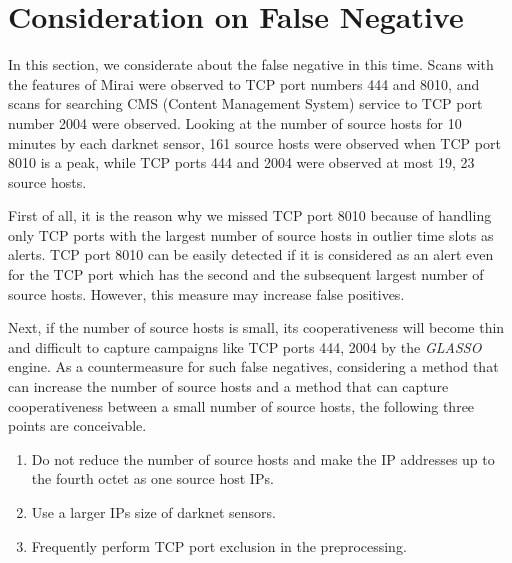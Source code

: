 \documentclass[conference]{IEEEtran}
\begin{document}

\section{Consideration on False Negative}
In this section, we considerate about the false negative in this time.
Scans with the features of Mirai were observed to TCP port numbers 444 and 8010, and scans for searching CMS (Content Management System) service to TCP port number 2004 were observed.
Looking at the number of source hosts for 10 minutes by each darknet sensor, 161 source hosts were observed when TCP port 8010 is a peak, while TCP ports 444 and 2004 were observed at most 19, 23 source hosts.


First of all, it is the reason why we missed TCP port 8010 because of handling only TCP ports with the largest number of source hosts in outlier time slots as alerts.
TCP port 8010 can be easily detected if it is considered as an alert even for the TCP port which has the second and the subsequent largest number of source hosts.
However, this measure may increase false positives.



Next, if the number of source hosts is small, its cooperativeness will become thin and difficult to capture campaigns like TCP ports 444, 2004 by the {\it GLASSO} engine.
As a countermeasure for such false negatives, considering a method that can increase the number of source hosts and a method that can capture cooperativeness between a small number of source hosts, the following three points are conceivable.
\begin{enumerate}
  \item Do not reduce the number of source hosts and make the IP addresses up to the fourth octet as one source host IPs.
  \item Use a larger IPs size of darknet sensors.
  \item Frequently perform TCP port exclusion in the preprocessing.
\end{enumerate}


\end{document}
